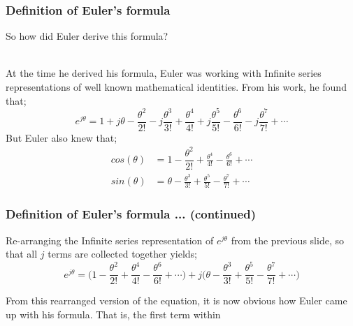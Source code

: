 \begin{frame}[t]

	\frametitle{Definition of Euler's formula}

	So how did Euler derive this formula?\\~

	At the time he derived his formula, Euler was working with Infinite series representations of well known mathematical identities. From his work, he found that;
	\begin{equation} \label{eqn_Infinite_series_of_e^jtheta}
	e^{j\theta} = 1 + j\theta - \dfrac{\theta^2}{2!} - j\frac{\theta^3}{3!} + \frac{\theta^4}{4!} + j\frac{\theta^5}{5!} - \frac{\theta^6}{6!} - j\frac{\theta^7}{7!} + \cdots
	\end{equation}
	But Euler also knew that;
	\begin{align}
	cos(\theta) &= 1 - \dfrac{\theta^2}{2!} + \frac{\theta^4}{4!} - \frac{\theta^6}{6!} + \cdots      \label{eqn_slide_3_a} \\
	sin(\theta) &= \theta - \frac{\theta^3}{3!} + \frac{\theta^5}{5!} - \frac{\theta^7}{7!} + \cdots  \label{eqn_slide_3_b}
	\end{align}

\end{frame}


\begin{frame}[t]

	\frametitle{Definition of Euler's formula ... (continued)}

	Re-arranging the Infinite series representation of \(e^{j\theta}\) from the previous slide, so that all \(j\) terms are collected together yields;
	\begin{equation} \label{eqn_slide_4_a}
	e^{j\theta} = \Big(1 - \dfrac{\theta^2}{2!} + \frac{\theta^4}{4!} - \frac{\theta^6}{6!} + \cdots\Big) + j\Big(\theta - \frac{\theta^3}{3!} + \frac{\theta^5}{5!} - \frac{\theta^7}{7!} + \cdots\Big)
	\end{equation}

	From this rearranged version of the equation, it is now obvious how Euler came up with his formula. That is, the first term within

\end{frame}
